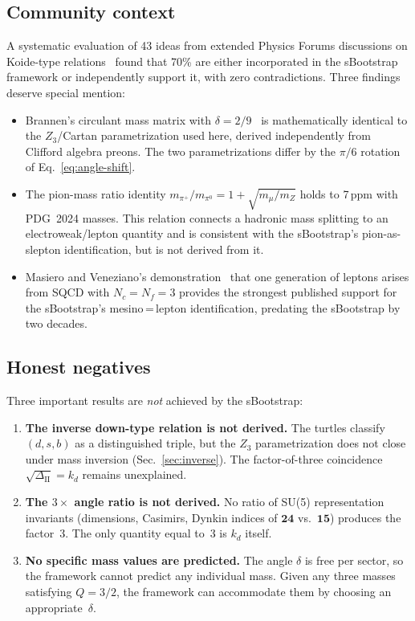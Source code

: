 \documentclass[prd,twocolumn,superscriptaddress,nofootinbib]{revtex4-2}
\begin{document}
\subsection{Community context}

A systematic evaluation of 43 ideas from extended Physics Forums
discussions on Koide-type relations~\cite{Rivero2007spectroscopy,
Brannen2006} found that 70\% are either incorporated in the sBootstrap
framework or independently support it, with zero contradictions.  Three
findings deserve special mention:

\begin{itemize}
\item Brannen's circulant mass matrix with $\delta=2/9$~\cite{Brannen2006}
  is mathematically identical to the $Z_3$/Cartan parametrization used
  here, derived independently from Clifford algebra preons.  The two
  parametrizations differ by the $\pi/6$ rotation of
  Eq.~\eqref{eq:angle-shift}.
\item The pion-mass ratio identity
  $m_{\pi^+}/m_{\pi^0} = 1 + \sqrt{m_\mu/m_Z}$
  holds to 7\,ppm with PDG~2024 masses.  This relation connects a
  hadronic mass splitting to an electroweak/lepton quantity and is
  consistent with the sBootstrap's pion-as-slepton identification, but
  is not derived from it.
\item Masiero and Veneziano's demonstration~\cite{MasieroVeneziano1984}
  that one generation of leptons arises from SQCD with $N_c=N_f=3$
  provides the strongest published support for the sBootstrap's
  mesino\,=\,lepton identification, predating the sBootstrap by two
  decades.
\end{itemize}

\subsection{Honest negatives}

Three important results are \emph{not} achieved by the sBootstrap:

\begin{enumerate}
\item \textbf{The inverse down-type relation is not derived.}  The
  turtles classify $(d,s,b)$ as a distinguished triple, but the $Z_3$
  parametrization does not close under mass inversion
  (Sec.~\ref{sec:inverse}).  The factor-of-three coincidence
  $\sqrt{\Delta_{\text{II}}}=k_d$ remains unexplained.
\item \textbf{The $3\times$ angle ratio is not derived.}  No ratio of
  SU(5) representation invariants (dimensions, Casimirs, Dynkin indices
  of $\mathbf{24}$ vs.\ $\mathbf{15}$) produces the factor~3.  The
  only quantity equal to~3 is $k_d$ itself.
\item \textbf{No specific mass values are predicted.}  The angle
  $\delta$ is free per sector, so the framework cannot predict any
  individual mass.  Given any three masses satisfying $Q=3/2$, the
  framework can accommodate them by choosing an appropriate~$\delta$.
\end{enumerate}
\end{document}
